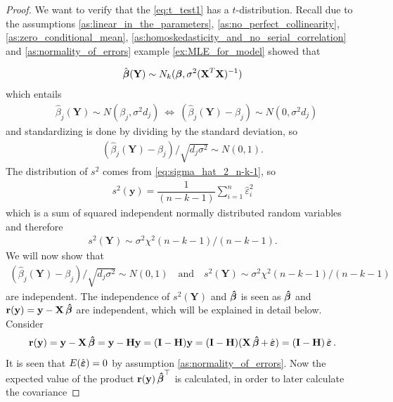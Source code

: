 \begin{proof}
We want to verify that the \eqref{eq:t_test1} has a $t$-distribution. Recall due to the assumptions \ref{as:linear_in_the_parameters}, \ref{as:no_perfect_collinearity}, \ref{as:zero_conditional_mean}, \ref{as:homoskedasticity_and_no_serial_correlation} and \ref{as:normality_of_errors} example \ref{ex:MLE_for_model} showed that

\begin{align} \label{eq:th_t_test}
    \hat{\operatorname{\boldsymbol{\beta}}}(\textbf{Y}) \sim N_k(\operatorname{\boldsymbol{\beta}},\sigma^2(\textbf{X}^T\textbf{X})^{-1})
\end{align}
which entails
\begin{align*}
    &\hat{\beta}_j(\textbf{Y})\sim N(\beta_j , \sigma^2d_j) \
    \Leftrightarrow \  (\hat{\beta}_j(\textbf{Y})-\beta_j) \sim N(0,\sigma^2d_j)
\end{align*}
and standardizing is done by dividing by the standard deviation, so
\begin{align*}
    (\hat{\beta}_j(\textbf{Y})-\beta_j)/\sqrt{d_j\sigma^2} \sim N(0,1).
\end{align*}
The distribution of $s^2$ comes from \eqref{eq:sigma_hat_2_n-k-1}, so
\begin{align} \label{eq:sigma_square_of_Y}
    s^2(\textbf{y}) = \dfrac{1}{(n-k-1)}\sum_{i=1}^n \hat{\varepsilon}_i^2
\end{align}
which is a sum of squared independent normally distributed random variables and therefore
\begin{align*}
s^2(\textbf{Y}) \sim \sigma^2 \chi^2(n-k-1)/(n-k-1).    
\end{align*}
We will now show that
\begin{align*}
    (\hat{\beta}_j(\textbf{Y})-\beta_j)/\sqrt{d_j\sigma^2} \sim N(0,1) \quad \text{and} \quad s^2(\textbf{Y}) \sim \sigma^2\chi^2 (n-k-1)/(n-k-1)
\end{align*}
are independent.
The independence of $s^2(\textbf{Y})$ and $\operatorname{\boldsymbol{\hat{\beta}}}$ is seen as $\operatorname{\boldsymbol{\hat{\beta}}}$ and $\textbf{r}(\textbf{y}) = \textbf{y} -\textbf{X} \operatorname{\boldsymbol{\hat{\beta}}}$ are independent, which will be explained in detail below.
Consider
\begin{align*}
    \textbf{r}(\textbf{y}) = \textbf{y}-\textbf{X} \operatorname{\boldsymbol{\hat{\beta}}} = \textbf{y} - \textbf{H} \textbf{y} = (\textbf{I}-\textbf{H})\textbf{y} = (\textbf{I}-\textbf{H}) (\textbf{X} \operatorname{\boldsymbol{\hat{\beta}}} + \operatorname{\hat{\boldsymbol{\varepsilon}}}) = (\textbf{I} - \textbf{H}) \operatorname{\hat{\boldsymbol{\varepsilon}}}.
\end{align*}
It is seen that $E(\operatorname{\hat{\boldsymbol{\varepsilon}}}) = 0$ by assumption \ref{as:normality_of_errors}. Now the expected value of the product $\textbf{r}(\textbf{y}) \operatorname{\boldsymbol{\hat{\beta}}}^\top$ is calculated, in order to later calculate the covariance

\end{proof}

